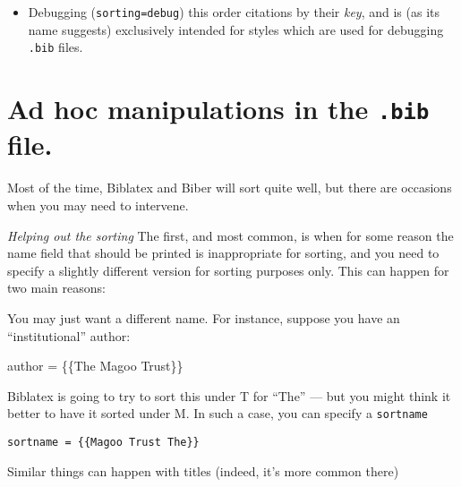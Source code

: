\begin{itemize}
    \begin{marginfigure}[1ex]
\vspace{0.5pt}
  \caption{\texttt{anyt} sorting}
  \end{marginfigure}
\item
  Debugging (\texttt{sorting=debug}) this order citations by their
  \emph{key}, and is (as its name suggests) exclusively intended for
  styles which are used for debugging \texttt{.bib} files.
\end{itemize}

\section{Ad hoc manipulations in the \texttt{.bib} file.}

Most of the time, Biblatex and Biber will sort quite well, but there are
occasions when you may need to intervene.

\emph{Helping out the sorting} The first, and most common, is when for
some reason the name field that should be printed is inappropriate for
sorting, and you need to specify a slightly different version for
sorting purposes only. This can happen for two main reasons:

  You may just want a different name. For instance, suppose you have an
  ``institutional'' author:

  author = \{\{The Magoo Trust\}\}

Biblatex is going to try to sort this under T for ``The'' --- but you
might think it better to have it sorted under M. In such a case, you can
specify a \texttt{sortname}

\begin{verbatim}
sortname = {{Magoo Trust The}}
\end{verbatim}

Similar things can happen with titles (indeed, it's more common there)

